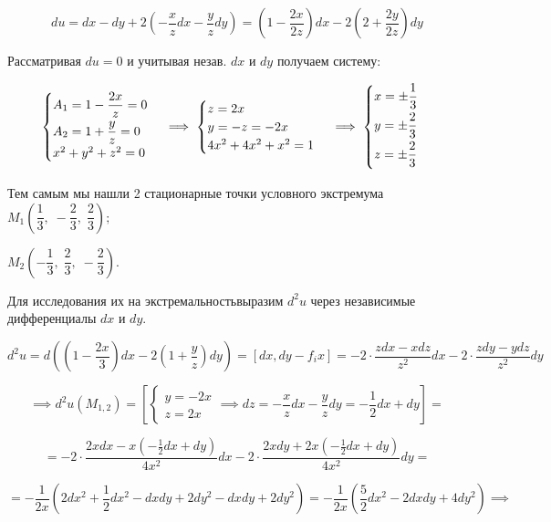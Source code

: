 \documentclass[../../main.tex]{subfiles}
\begin{document}
	
	\[du = dx - dy + 2\left(-\dfrac{x}{z} dx - \dfrac{y}{z}dy\right) = 
	\left(1 - \dfrac{2x}{2z}\right)dx - 2\left(2 + \dfrac{2y}{2z}\right)dy\]
	
	Рассматривая $du = 0$ и учитывая незав. $dx$ и $dy$ получаем систему:
	
	\[\begin{cases}
	\smallskip
	A_1 = 1 - \dfrac{2x}{z} = 0\\
	A_2 = 1 + \dfrac{y}{z} = 0\\
	x^2 + y^2 + z^2 = 0
	\end{cases} \implies \begin{cases}
	z = 2x\\
	y = -z = -2x\\
	4x^2 + 4x^2 + x^2 = 1
	\end{cases} \implies \begin{cases}
	\smallskip
	x = \pm \dfrac{1}{3}\\
	\smallskip
	y = \pm \dfrac{2}{3}\\
	\smallskip
	z = \pm \dfrac{2}{3}\\
	\end{cases}\]
	
	Тем самым мы нашли 2 стационарные точки условного экстремума 
	$M_1\left(\dfrac{1}{3},\; -\dfrac{2}{3},\; \dfrac{2}{3}\right);$
	
	$ M_2\left(-\dfrac{1}{3},\; \dfrac{2}{3}, \; -\dfrac{2}{3}\right)$.
	
	Для исследования их на экстремальностьвыразим $d^2u$ 
	через независимые дифференциалы $dx$ и $dy$.
	
	\[d^2u = d\left( \left(1 - \dfrac{2x}{3}\right)dx - 
	2\left(1 + \dfrac{y}{z}\right)dy\right) = 
	\left[dx, dy - f_ix\right] = -2 \cdot 
	\dfrac{zdx - xdz}{z^2}dx - 2 \cdot \dfrac{zdy - ydz}{z^2}dy\]
	
	\[\implies d^2u\left(M_{1, 2}\right) = \left[
	\begin{cases}
	y = -2x\\
	z = 2x 
	\end{cases} \implies dz = -\dfrac{x}{z}dx - \dfrac{y}{z}dy = 
	-\dfrac{1}{2}dx + dy 
	\right] =\]
	
	\[ = -2 \cdot \frac{2xdx - x\left(-\frac{1}{2}dx + dy\right)}{4x^2}dx - 
	2 \cdot \frac{2xdy + 2x \left(-\frac{1}{2}dx + dy\right)}{4x^2}dy = \]
	
	\[= -\dfrac{1}{2x}\left(2dx^2 + \dfrac{1}{2}dx^2 - dxdy + 2dy^2 - 
	dxdy + 2dy^2 \right) = -\dfrac{1}{2x} \left( \dfrac{5}
	{2} dx^2 - 2dxdy + 4dy^2 \right) \implies \]
	
\end{document}
